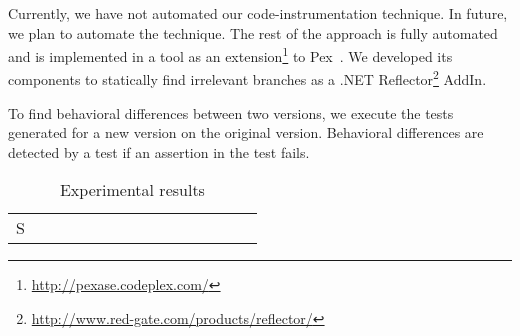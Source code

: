 Currently, we have not automated our code-instrumentation technique. In future, we plan to automate the technique.  
The rest of the approach is fully automated and is implemented in a tool as an extension\footnote{\scriptsize\url{http://pexase.codeplex.com/}} to Pex~\cite{Pex}. We developed its components to statically find irrelevant branches as a .NET Reflector\footnote{\scriptsize\url{http://www.red-gate.com/products/reflector/}} AddIn.

To find behavioral differences between two versions, we execute the tests generated for a new version on the original version.
Behavioral differences are detected by a test if an assertion in the test fails. 
\begin{table}
\begin{CodeOut}
\begin{center}
\vspace{-1cm}
\caption {\label{table:all_results}\scriptsize{Experimental results}}
\begin {tabular} {|l|c|c|c|c|c|c|c|c|c|c|c|c|c|c|}
\hline
S &\CenterCell{V} %
&\CenterCell{$P_{Pex}$}&\CenterCell{$P_{Red}(\%)$}
&\CenterCell{$M_p$}
&\CenterCell{$Tp_{Pex}$}&\CenterCell{$Ts$+ $T_d$}&\CenterCell{$Tp_{Red}(\%)$}
&\CenterCell{$I_{i}$}&\CenterCell{$I_{wi}$}
\\


\end{tabular}
\end{center}
\end{CodeOut}
\end{table}
